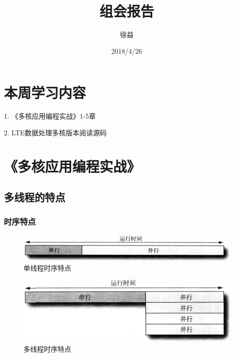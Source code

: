 \documentclass{article}
\title{组会报告}
\author{徐益}
\date{2018/4/26}
\begin{document}
\maketitle


\section{本周学习内容}

1. 《多核应用编程实战》1-5章

2. LTE数据处理多核版本阅读源码

\section{《多核应用编程实战》}
\subsection{多线程的特点}
\subsubsection{时序特点}
\begin{figure}[H]
	\centering
	\includegraphics[width = .8\textwidth]{single_time.jpg}
	\caption{单线程时序特点}
\end{figure}
\begin{figure}[H]
	\centering
	\includegraphics[width = .8\textwidth]{muti_time.jpg}
	\caption{多线程时序特点}
\end{figure}
\end{document}
